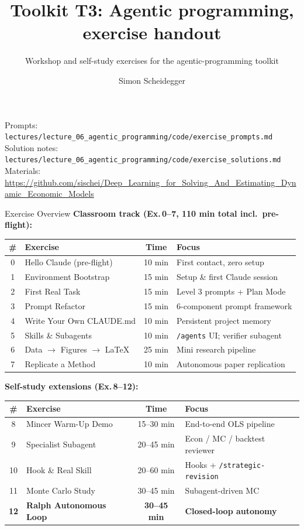 \documentclass[aspectratio=169,10pt]{beamer}
\title[Toolkit T3]{Toolkit T3: Agentic programming, exercise handout}
\subtitle{Workshop and self-study exercises for the agentic-programming toolkit}
\author{Simon Scheidegger}
\institute[HEC Lausanne]{HEC, University of Lausanne}
\date{}
\newcommand{\emphc}[1]{\textcolor{harvardcrimson}{#1}}
\begin{document}
{
\begin{frame}
\titlepage
\begin{center}
{\footnotesize Prompts: \texttt{lectures/lecture\_06\_agentic\_programming/code/exercise\_prompts.md}\\
Solution notes: \texttt{lectures/lecture\_06\_agentic\_programming/code/exercise\_solutions.md}\\[2pt]
Materials: \url{https://github.com/sischei/Deep_Learning_for_Solving_And_Estimating_Dynamic_Economic_Models}}
\end{center}
\end{frame}}

\begin{frame}{Exercise Overview}
\scriptsize
\textbf{Classroom track (Ex.\,0--7, 110 min total incl.\ pre-flight):}
\renewcommand{\arraystretch}{1.05}
\begin{center}
\begin{tabular}{c l c l}
\toprule
\textbf{\#} & \textbf{Exercise} & \textbf{Time} & \textbf{Focus} \\
\midrule
0 & Hello Claude (\emphc{pre-flight}) & 10 min & First contact, zero setup \\
1 & Environment Bootstrap & 15 min & Setup \& first Claude session \\
2 & First Real Task & 15 min & Level 3 prompts + Plan Mode \\
3 & Prompt Refactor & 15 min & 6-component prompt framework \\
4 & Write Your Own CLAUDE.md & 10 min & Persistent project memory \\
5 & Skills \& Subagents & 10 min & \texttt{/agents} UI; verifier subagent \\
6 & Data $\to$ Figures $\to$ LaTeX & 25 min & Mini research pipeline \\
7 & Replicate a Method & 10 min & Autonomous paper replication \\
\bottomrule
\end{tabular}
\end{center}

\vspace{0.4em}
\textbf{Self-study extensions (Ex.\,8--12):}
\begin{center}
\begin{tabular}{c l c l}
\toprule
\textbf{\#} & \textbf{Exercise} & \textbf{Time} & \textbf{Focus} \\
\midrule
8  & Mincer Warm-Up Demo & 15--30 min & End-to-end OLS pipeline \\
9  & Specialist Subagent & 20--45 min & Econ / MC / backtest reviewer \\
10 & Hook \& Real Skill & 20--60 min & Hooks + \texttt{/strategic-revision} \\
11 & Monte Carlo Study & 30--45 min & Subagent-driven MC \\
\textbf{12} & \textbf{Ralph Autonomous Loop} & \textbf{30--45 min} & \textbf{Closed-loop autonomy} \\
\bottomrule
\end{tabular}
\end{center}


\end{frame}
\end{document}

